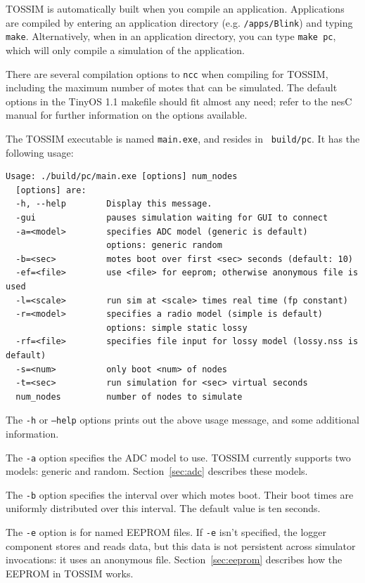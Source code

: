\documentclass[10pt,fleqn]{article}
\def\sim{TOSSIM\xspace}
\begin{document}
\sim is automatically built when you compile an
application. Applications are compiled by entering an application
directory (e.g. {\tt /apps/Blink}) and typing {\tt
make}. Alternatively, when in an application directory, you can type
{\tt make pc}, which will only compile a simulation of the
application.

There are several compilation options to {\tt ncc} when compiling for
TOSSIM, including the maximum number of motes that can be
simulated. The default options in the TinyOS 1.1 makefile should fit
almost any need; refer to the nesC manual for further information on
the options available.

The \sim executable is named {\tt main.exe}, and resides in {\tt
build/pc}. It has the following usage:

\begin{verbatim}
Usage: ./build/pc/main.exe [options] num_nodes
  [options] are:
  -h, --help        Display this message.
  -gui              pauses simulation waiting for GUI to connect
  -a=<model>        specifies ADC model (generic is default)
                    options: generic random
  -b=<sec>          motes boot over first <sec> seconds (default: 10)
  -ef=<file>        use <file> for eeprom; otherwise anonymous file is used
  -l=<scale>        run sim at <scale> times real time (fp constant)
  -r=<model>        specifies a radio model (simple is default)
                    options: simple static lossy
  -rf=<file>        specifies file input for lossy model (lossy.nss is default)
  -s=<num>          only boot <num> of nodes
  -t=<sec>          run simulation for <sec> virtual seconds
  num_nodes         number of nodes to simulate
\end{verbatim}

The {\tt -h} or {\tt --help} options prints out the above usage
message, and some additional information.

The {\tt -a} option specifies the ADC model to use. \sim currently
supports two models: generic and random. Section~\ref{sec:adc}
describes these models.

The {\tt -b} option specifies the interval over which motes
boot. Their boot times are uniformly distributed over this
interval. The default value is ten seconds.

The {\tt -e} option is for named EEPROM files. If {\tt -e} isn't
specified, the logger component stores and reads data, but this data
is not persistent across simulator invocations: it uses an anonymous
file. Section~\ref{sec:eeprom} describes how the EEPROM in \sim works.
\end{document}
